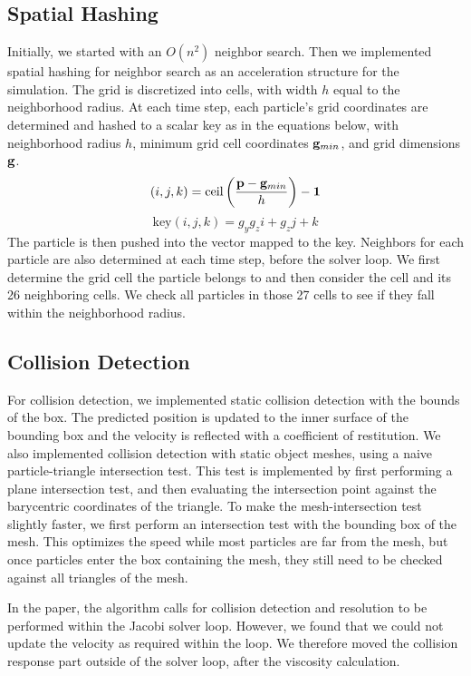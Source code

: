 \documentclass[conference]{IEEEtran}
\begin{document}
\subsection*{Spatial Hashing} 
Initially, we started with an $O(n^2)$ neighbor search. Then we implemented spatial hashing for neighbor search as an acceleration structure for the simulation. The grid is discretized into cells, with width $h$ equal to the neighborhood radius. At each time step, each particle's grid coordinates are determined and hashed to a scalar key as in the equations below, with neighborhood radius $h$, minimum grid cell coordinates $\bold g_{min}$, and grid dimensions $\bold g$. 
\begin{equation*}
(i,j,k) = \text{ceil}\left(\frac{\bold p-\bold g_{min}}{h} \right)-\bold 1
\end{equation*}
\begin{equation*}
\text{key}(i,j,k) = g_y g_z i + g_z j + k
\end{equation*}
The particle is then pushed into the vector mapped to the key. Neighbors for each particle are also determined at each time step, before the solver loop. We first determine the grid cell the particle belongs to and then consider the cell and its 26 neighboring cells. We check all particles in those 27 cells to see if they fall within the neighborhood radius.
\subsection*{Collision Detection} 
For collision detection, we implemented static collision detection with the bounds of the box. The predicted position is updated to the inner surface of the bounding box and the velocity is reflected with a coefficient of restitution. We also implemented collision detection with static object meshes, using a naive particle-triangle intersection test. This test is implemented by first performing a plane intersection test, and then evaluating the intersection point against the barycentric coordinates of the triangle. To make the mesh-intersection test slightly faster, we first perform an intersection test with the bounding box of the mesh. This optimizes the speed while most particles are far from the mesh, but once particles enter the box containing the mesh, they still need to be checked against all triangles of the mesh. 

In the paper, the algorithm calls for collision detection and resolution to be performed within the Jacobi solver loop. However, we found that we could not update the velocity as required within the loop. We therefore moved the collision response part outside of the solver loop, after the viscosity calculation. 
\end{document}
